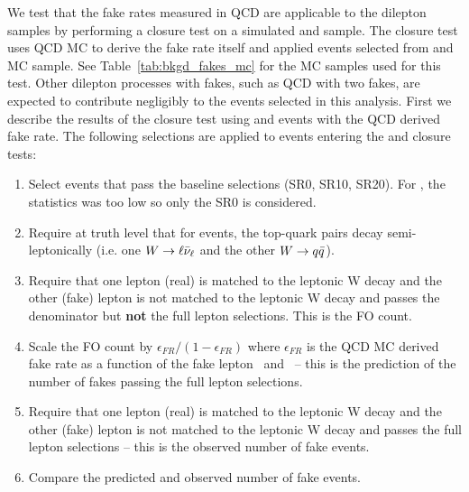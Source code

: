 We test that the fake rates measured in QCD are applicable to the dilepton
samples by performing a closure test on a simulated \ttbar and \Wj sample. The
closure test uses QCD MC to derive the fake rate itself and applied events
selected from \ttbar and \Wj MC sample. See Table~\ref{tab:bkgd_fakes_mc}
for the MC samples used for this test. Other dilepton processes with fakes,
such as QCD with two fakes, are expected to contribute negligibly to the events
selected in this analysis. First we describe the results of the closure test
using \ttbar and \Wj events with the QCD derived fake rate. The following selections
are applied to events entering the \ttbar and \Wj closure tests:
\begin{enumerate}
\item Select events that pass the baseline selections (SR0, SR10, SR20). For
\Wj, the statistics was too low so only the SR0 is considered.
\item Require at truth level that for \ttbar events, the top-quark pairs decay
semi-leptonically (i.e. one $\relax{W} \to \ell\bar{\nu}_{\ell}$ and the other $\relax{W} \to q\bar{q}$).
\item Require that one lepton (real) is matched to the leptonic W decay and
the other (fake) lepton is not matched to the leptonic W decay and passes the
denominator but {\bf not} the full lepton selections.  This is the FO count.
\item Scale the FO count by $\epsilon_{FR}/(1-\epsilon_{FR})$ where
$\epsilon_{FR}$ is the QCD MC derived fake rate as a function of the fake
lepton \pt~and \aeta\ -- this is the prediction of the number of fakes passing
the full lepton selections.
\item Require that one lepton (real) is matched to the leptonic W decay and the
other (fake) lepton is not matched to the leptonic W decay and passes the full
lepton selections -- this is the observed number of fake events.
\item Compare the predicted and observed number of fake events.
\end{enumerate}

